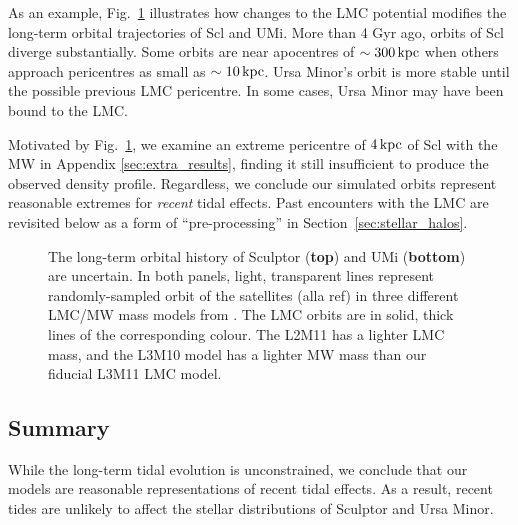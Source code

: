 As an example, Fig.~\ref{fig:scl_orbit_lmc_uncert} illustrates how
changes to the LMC potential modifies the long-term orbital trajectories
of Scl and UMi. More than 4 Gyr ago, orbits of Scl diverge
substantially. Some orbits are near apocentres of \(\sim 300\,{\rm kpc}\)
when others approach pericentres as small as \(\sim 10\,{\rm kpc}\). Ursa
Minor's orbit is more stable until the possible previous LMC pericentre.
In some cases, Ursa Minor may have been bound to the LMC.

Motivated by Fig.~\ref{fig:scl_orbit_lmc_uncert}, we examine an extreme
pericentre of \(4\,{\rm kpc}\) of Scl with the MW in Appendix
\ref{sec:extra_results}, finding it still insufficient to produce the
observed density profile. Regardless, we conclude our simulated orbits
represent reasonable extremes for \emph{recent} tidal effects. Past
encounters with the LMC are revisited below as a form of
``pre-processing'' in Section~\ref{sec:stellar_halos}.

\begin{figure}
\centering
{}
\caption[Sculptor Orbits with LMC]{The long-term orbital history of
Sculptor (\textbf{top}) and UMi (\textbf{bottom}) are uncertain. In both
panels, light, transparent lines represent randomly-sampled orbit of the
satellites (alla ref) in three different LMC/MW mass models from
\citet{vasiliev2024}. The LMC orbits are in solid, thick lines of the
corresponding colour. The L2M11 has a lighter LMC mass, and the L3M10
model has a lighter MW mass than our fiducial L3M11 LMC
model.}\label{fig:scl_orbit_lmc_uncert}
\end{figure}

\subsection{Summary}\label{summary-2}

While the long-term tidal evolution is unconstrained, we conclude that
our models are reasonable representations of recent tidal effects. As a
result, recent tides are unlikely to affect the stellar distributions of
Sculptor and Ursa Minor.

